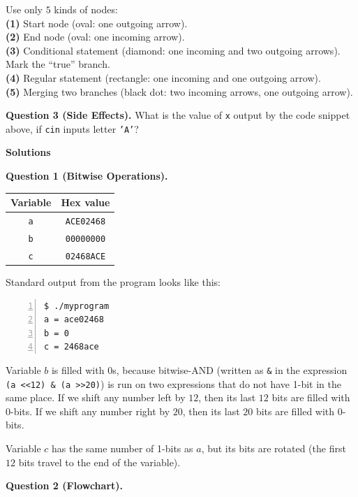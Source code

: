 \documentclass[11pt]{article}
\begin{document}
Use only $5$ kinds of nodes:\\
{\footnotesize
{\bf (1)} Start node (oval: one outgoing arrow).\\
{\bf (2)} End node (oval: one incoming arrow).\\
{\bf (3)} Conditional statement (diamond: one incoming and two outgoing arrows). Mark the ``true'' branch.\\
{\bf (4)} Regular statement (rectangle: one incoming and one outgoing arrow).\\
{\bf (5)} Merging two branches (black dot: two incoming arrows, one outgoing arrow).
}



\vspace{20pt}
{\bf Question 3 (Side Effects).}
What is the value of {\tt x} output by the code snippet above, 
if {\tt cin} inputs letter {\tt 'A'}?


\newpage
{\bf \LARGE Solutions}

\vspace{10pt}
{\bf Question 1 (Bitwise Operations).} 

\begin{tabular}{|c|c|} \hline
{\bf Variable} & {\bf Hex value} \\ \hline
{\tt a} & {\tt ACE02468}  \\ \hline
{\tt b} & {\tt 00000000} \\ \hline
{\tt c} & {\tt 02468ACE} \\ \hline
\end{tabular}

Standard output from the program looks like this:

\begin{Verbatim}[frame=single,numbers=left]
$ ./myprogram
a = ace02468
b = 0
c = 2468ace
\end{Verbatim}

Variable $b$ is filled with 0s, because bitwise-AND 
(written as {\tt \&} in the expression {\tt (a \textless\textless 12) \& (a \textgreater\textgreater 20)}) is run on two expressions that do not 
have 1-bit in the same place. If we shift any number left by $12$, 
then its last $12$ bits are filled with 0-bits. 
If we shift any number right by $20$, then its last $20$ bits are 
filled with 0-bits. 

Variable $c$ has the same number of 1-bits as $a$, but its bits are rotated
(the first $12$ bits travel to the end of the variable).

\vspace{20pt}
{\bf Question 2 (Flowchart).} 
\end{document}
